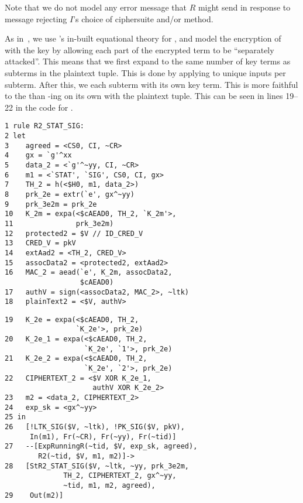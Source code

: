Note that we do not model any error message that $R$ might send in response to message \mMsgone rejecting $I$'s choice of ciphersuite and/or method.
%

As in~\cite{Norr21}, we use \mTamarin's in-built equational theory for \mXor{}, and model the \mXor{} encryption of  with the key  by allowing each part of the encrypted term to be ``separately attacked''.
%
This means that we first expand  to the same number of key terms as subterms in the plaintext tuple.
%
This is done by applying \mHkdfExpand{} to unique inputs per subterm.
%
After this, we \mXor{} each subterm with its own key term.
%
This is more faithful to the \mSpec{} than \mXor-ing  on its own with the plaintext tuple.
%
This can be seen in lines 19--22 in the code for .

{
\bgroup
\parindent 0pt
\begin{minipage}{0.49\textwidth}
\bgroup
\parindent 0pt
\begin{scriptsize}
\begin{verbatim}
1 rule R2_STAT_SIG:
2 let
3    agreed = <CS0, CI, ~CR>
4    gx = `g'^xx
5    data_2 = <`g'^~yy, CI, ~CR>
6    m1 = <`STAT', `SIG', CS0, CI, gx>
7    TH_2 = h(<$H0, m1, data_2>)
8    prk_2e = extr(`e', gx^~yy)
9    prk_3e2m = prk_2e
10   K_2m = expa(<$cAEAD0, TH_2, `K_2m'>,
11               prk_3e2m)
12   protected2 = $V // ID_CRED_V
13   CRED_V = pkV
14   extAad2 = <TH_2, CRED_V>
15   assocData2 = <protected2, extAad2>
16   MAC_2 = aead(`e', K_2m, assocData2,
                  $cAEAD0)
17   authV = sign(<assocData2, MAC_2>, ~ltk)
18   plainText2 = <$V, authV>
\end{verbatim}
\end{scriptsize}
\egroup
\end{minipage}
\begin{minipage}{0.02\textwidth}
\end{minipage}
\begin{minipage}{0.48\textwidth}
\bgroup
\parindent 0pt
\begin{scriptsize}
\begin{verbatim}
19   K_2e = expa(<$cAEAD0, TH_2,
                 `K_2e'>, prk_2e)
20   K_2e_1 = expa(<$cAEAD0, TH_2,
                   `K_2e', `1'>, prk_2e)
21   K_2e_2 = expa(<$cAEAD0, TH_2,
                   `K_2e', `2'>, prk_2e)
22   CIPHERTEXT_2 = <$V XOR K_2e_1,
                     authV XOR K_2e_2>
23   m2 = <data_2, CIPHERTEXT_2>
24   exp_sk = <gx^~yy>
25 in
26   [!LTK_SIG($V, ~ltk), !PK_SIG($V, pkV),
      In(m1), Fr(~CR), Fr(~yy), Fr(~tid)]
27   --[ExpRunningR(~tid, $V, exp_sk, agreed),
        R2(~tid, $V, m1, m2)]->
28   [StR2_STAT_SIG($V, ~ltk, ~yy, prk_3e2m,
              TH_2, CIPHERTEXT_2, gx^~yy,
              ~tid, m1, m2, agreed),
29    Out(m2)]
\end{verbatim}
\end{scriptsize}
\egroup
\end{minipage}
\\
\egroup
%
}

